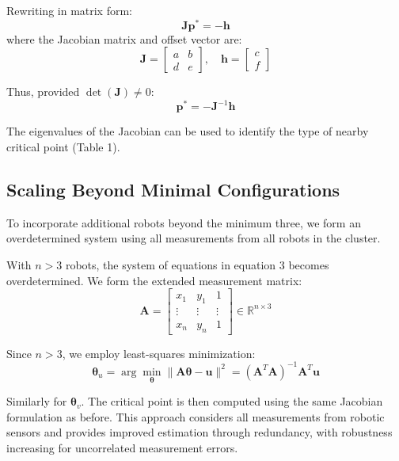 \documentclass[lettersize,journal]{IEEEtran}
\begin{document}
Rewriting in matrix form:
\begin{equation}
\mathbf{J}\mathbf{p}^* = -\mathbf{h}
\end{equation}
where the Jacobian matrix and offset vector are:
\begin{equation}
\mathbf{J} = \begin{bmatrix} a & b \\ d & e \end{bmatrix}, \quad \mathbf{h} = \begin{bmatrix} c \\ f \end{bmatrix}
\end{equation}

Thus, provided $\det(\mathbf{J}) \neq 0$:
\begin{equation}
\mathbf{p}^* = -\mathbf{J}^{-1}\mathbf{h}
\end{equation}

The eigenvalues of the Jacobian can be used to identify the type of nearby critical point (Table 1).

\subsection{Scaling Beyond Minimal Configurations}

To incorporate additional robots beyond the minimum three, we form an overdetermined system using all measurements from all robots in the cluster.

With $n > 3$ robots, the system of equations in equation 3 becomes overdetermined. We form the extended measurement matrix:
\begin{equation}
\mathbf{A} = \begin{bmatrix} x_1 & y_1 & 1 \\ \vdots & \vdots & \vdots \\ x_n & y_n & 1 \end{bmatrix} \in \mathbb{R}^{n \times 3}
\end{equation}

Since $n > 3$, we employ least-squares minimization:
\begin{equation}
\boldsymbol{\theta}_u = \arg\min_{\boldsymbol{\theta}} \|\mathbf{A}\boldsymbol{\theta} - \mathbf{u}\|^2 = (\mathbf{A}^T\mathbf{A})^{-1}\mathbf{A}^T\mathbf{u}
\end{equation}

Similarly for $\boldsymbol{\theta}_v$. The critical point is then computed using the same Jacobian formulation as before. This approach considers all measurements from robotic sensors  and provides improved estimation through redundancy, with robustness increasing for uncorrelated measurement errors.
\end{document}
